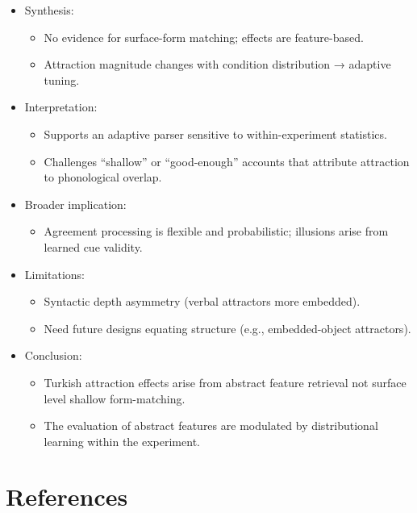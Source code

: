 \documentclass[
  authoryear,
  3p]{elsarticle}
\providecommand{\tightlist}{%
  \setlength{\itemsep}{0pt}\setlength{\parskip}{0pt}}
\begin{document}
\begin{itemize}
\tightlist
\item
  Synthesis:

  \begin{itemize}
  \tightlist
  \item
    No evidence for surface-form matching; effects are feature-based.
  \item
    Attraction magnitude changes with condition distribution → adaptive
    tuning.
  \end{itemize}
\item
  Interpretation:

  \begin{itemize}
  \tightlist
  \item
    Supports an adaptive parser sensitive to within-experiment
    statistics.
  \item
    Challenges ``shallow'' or ``good-enough'' accounts that attribute
    attraction to phonological overlap.
  \end{itemize}
\item
  Broader implication:

  \begin{itemize}
  \tightlist
  \item
    Agreement processing is flexible and probabilistic; illusions arise
    from learned cue validity.
  \end{itemize}
\item
  Limitations:

  \begin{itemize}
  \tightlist
  \item
    Syntactic depth asymmetry (verbal attractors more embedded).
  \item
    Need future designs equating structure (e.g., embedded-object
    attractors).
  \end{itemize}
\item
  Conclusion:

  \begin{itemize}
  \tightlist
  \item
    Turkish attraction effects arise from abstract feature retrieval not
    surface level shallow form-matching.
  \item
    The evaluation of abstract features are modulated by distributional
    learning within the experiment.
  \end{itemize}
\end{itemize}

\section*{References}\label{references}

\newcommand{\doi}[1]{\href{http://dx.doi.org/#1}{http://dx.doi.org/#1}}
\begingroup
\raggedright
\singlespacing

\renewcommand{\bibsection}{}


\endgroup
\end{document}
